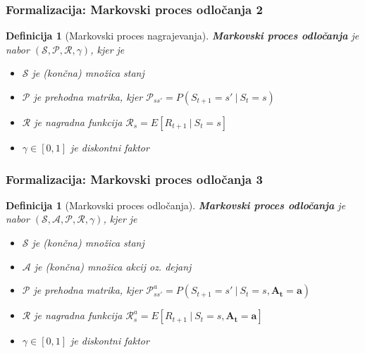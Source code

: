 \documentclass{beamer}    %
\newtheorem{definicija}[izrek]{Definicija}
\begin{document}
\begin{frame}
    \frametitle{Formalizacija: Markovski proces odločanja 2}
    \begin{definicija}[Markovski proces nagrajevanja]
        \textbf{Markovski proces odločanja} je nabor 
        $(\mathcal{S}, \mathcal{P}, \mathcal{R}, \gamma)$, kjer je
        \begin{itemize}
            \item $\mathcal{S}$ je (končna) množica stanj
            \item $\mathcal{P}$ je prehodna matrika, kjer $\mathcal{P}_{ss'} = P(S_{t+1} = s'~|~S_{t} = s)$
            \item $\mathcal{R}$ je nagradna funkcija $\mathcal{R}_s = E[R_{t+1}~|~S_{t} = s]$
            \item $\gamma \in [0, 1]$ je diskontni faktor
        \end{itemize}
    \end{definicija}
\end{frame}


\begin{frame}
    \frametitle{Formalizacija: Markovski proces odločanja 3}
    \begin{definicija}[Markovski proces odločanja]
        \textbf{Markovski proces odločanja} je nabor 
        $(\mathcal{S}, \mathcal{A}, \mathcal{P}, \mathcal{R}, \gamma)$, kjer je
        \begin{itemize}
            \item $\mathcal{S}$ je (končna) množica stanj
            \item $\mathcal{A}$ je (končna) množica akcij oz. dejanj
            \item $\mathcal{P}$ je prehodna matrika, kjer $\mathcal{P}_{ss'}^a = P(S_{t+1} = s'~|~S_{t} = s,
                    \mathbf{A_t = a})$
            \item $\mathcal{R}$ je nagradna funkcija $\mathcal{R}_s^a = E[R_{t+1}~|~S_{t} = s, 
                    \mathbf{A_t = a}]$
            \item $\gamma \in [0, 1]$ je diskontni faktor
        \end{itemize}
    \end{definicija}
\end{frame}
\end{document}
